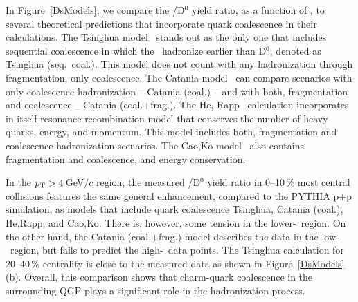 In Figure~\ref{DsModels}, we compare the \Ds/D$^0$ yield ratio, as a function of \pt, to several theoretical predictions that incorporate quark coalescence in their calculations. The Tsinghua model~\cite{baryonToMesonEnhancementSequentially} stands out as the only one that includes sequential coalescence in which the \Ds\ hadronize earlier than D$^0$, denoted as Tsinghua (seq.\ coal.)\@. This model does not count with any hadronization through fragmentation, only coalescence. The Catania model~\cite{fragmentationAA} can compare scenarios with only coalescence hadronization -- Catania (coal.) -- and with both, fragmentation and coalescence -- Catania (coal.+frag.)\@. The He, Rapp~\cite{RappLc} calculation incorporates in itself resonance recombination model that conserves the number of heavy quarks, energy, and momentum.  This model includes both, fragmentation and coalescence hadronization scenarios. The Cao,Ko model~\cite{CaoKoDs} also contains fragmentation and coalescence, and energy conservation. 

In the ${p_{\mathrm{T}}} > 4\,$GeV$/c$ region, the measured \Ds/D$^0$ yield ratio in 0--10$\,\%$ most central collisions features the same general enhancement, compared to the PYTHIA p+p simulation, as models that include quark coalescence Tsinghua, Catania (coal.), He,Rapp, and Cao,Ko. There is, however, some tension in the lower-\pt\ region. On the other hand, the Catania (coal.+frag.) model describes the data in the low-\pt\ region, but fails to predict the high-\pt\ data points. The Tsinghua calculation for 20--40$\,\%$ centrality is close to the measured data as shown in Figure~\ref{DsModels}(b)\@. Overall, this comparison shows that charm-quark coalescence in the surrounding QGP plays a significant role in the hadronization process.

